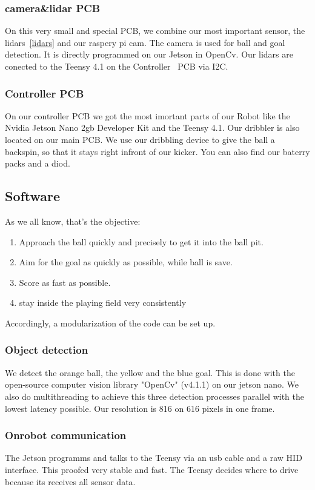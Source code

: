 \documentclass{scrartcl}
\begin{document}
\subsubsection*{camera\&lidar PCB}
On this very small and special PCB, we combine our most important sensor, the lidars~\ref{lidars} and our raspery pi 
cam. The camera is used for ball and goal detection. It is directly programmed on our Jetson in OpenCv.
Our lidars are conected to the Teensy 4.1 on the Controller~\label{PCB:Controller} PCB via I2C.

\subsubsection{Controller PCB}

On our controller PCB we got the most imortant parts of our Robot like the Nvidia Jetson Nano 2gb Developer Kit
and the Teensy 4.1. Our dribbler is also located on our main PCB. We use our dribbling device
to give the ball a backspin, so that it stays right infront of our kicker. You can also find our baterry packs 
and a diod. 

 \subsection{Software} %
 As we all know, that's the objective:
 \begin{enumerate}
     \item{Approach the ball quickly and precisely to get it into the ball pit.}
     \item{Aim for the goal as quickly as possible, while ball is save.}
     \item{Score as fast as possible.}
     \item {stay inside the playing field very consistently}
 \end{enumerate}
 Accordingly, a modularization of the code can be set up.
 \subsubsection{Object detection}
We detect the orange ball, the yellow and the blue goal. This is done with the open-source computer vision library "OpenCv" (v4.1.1) 
on our jetson nano. We also do multithreading to achieve this three detection processes parallel with the lowest latency possible.
Our resolution is 816 on 616 pixels in one frame.
\subsubsection{Onrobot communication}
The Jetson programms and talks to the Teensy via an usb cable and a raw HID interface. This proofed very stable and fast. The Teensy decides where 
to drive because its receives all sensor data.   
 
\end{document}
